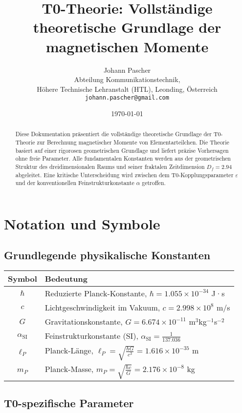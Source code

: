 \documentclass[12pt,a4paper]{article}
\title{T0-Theorie: Vollständige theoretische Grundlage der magnetischen Momente}
\author{Johann Pascher\\
	Abteilung Kommunikationstechnik,\\
	Höhere Technische Lehranstalt (HTL), Leonding, Österreich\\
	\texttt{johann.pascher@gmail.com}}
\date{\today}
\numberwithin{equation}{section}
\newcommand{\epsilonT}{\varepsilon}
\newcommand{\alphaSI}{\alpha_{\text{SI}}}
\newcommand{\Df}{D_f}
\newcommand{\lP}{\ell_P}
\begin{document}
	
	\maketitle
	
	\begin{abstract}
		Diese Dokumentation präsentiert die vollständige theoretische Grundlage der T0-Theorie zur Berechnung magnetischer Momente von Elementarteilchen. Die Theorie basiert auf einer rigorosen geometrischen Grundlage und liefert präzise Vorhersagen ohne freie Parameter. Alle fundamentalen Konstanten werden aus der geometrischen Struktur des dreidimensionalen Raums und seiner fraktalen Zeitdimension $\Df = 2.94$ abgeleitet. Eine kritische Unterscheidung wird zwischen dem T0-Kopplungsparameter $\epsilonT$ und der konventionellen Feinstrukturkonstante $\alpha$ getroffen.
	\end{abstract}
	
	\tableofcontents
	\newpage
	
	\section{Notation und Symbole}
	
	\subsection{Grundlegende physikalische Konstanten}
	
	\begin{longtable}{cl}
		\toprule
		\textbf{Symbol} & \textbf{Bedeutung} \\
		\midrule
		$\hbar$ & Reduzierte Planck-Konstante, $\hbar = 1.055 \times 10^{-34}$ J·s \\
		$c$ & Lichtgeschwindigkeit im Vakuum, $c = 2.998 \times 10^{8}$ m/s \\
		$G$ & Gravitationskonstante, $G = 6.674 \times 10^{-11}$ m$^3$kg$^{-1}$s$^{-2}$ \\
		$\alphaSI$ & Feinstrukturkonstante (SI), $\alphaSI = \frac{1}{137.036}$ \\
		$\lP$ & Planck-Länge, $\lP = \sqrt{\frac{\hbar G}{c^3}} = 1.616 \times 10^{-35}$ m \\
		$m_P$ & Planck-Masse, $m_P = \sqrt{\frac{\hbar c}{G}} = 2.176 \times 10^{-8}$ kg \\
		\bottomrule
	\end{longtable}
	
	\subsection{T0-spezifische Parameter}
	
\end{document}
